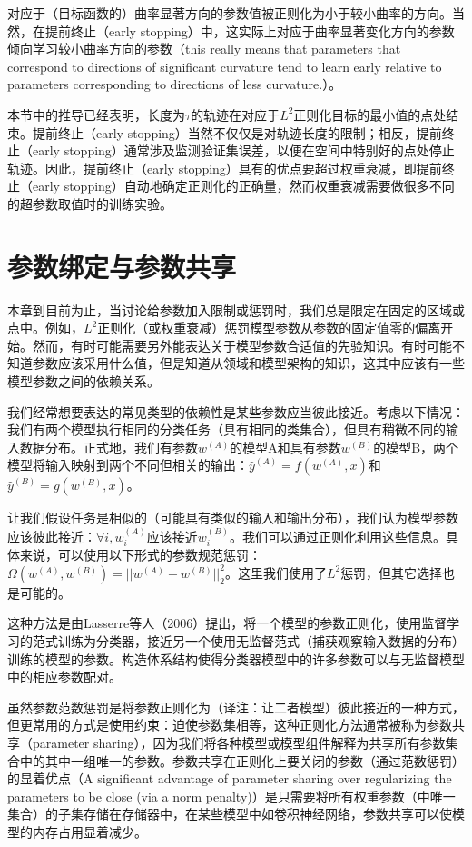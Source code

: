 对应于（目标函数的）曲率显著方向的参数值被正则化为小于较小曲率的方向。当然，在提前终止（early stopping）中，这实际上对应于曲率显著变化方向的参数倾向学习较小曲率方向的参数（this really means that parameters that correspond to directions of signiﬁcant curvature tend to learn early relative to parameters corresponding to directions of less curvature.）。

本节中的推导已经表明，长度为$\tau$的轨迹在对应于$L^2$正则化目标的最小值的点处结束。提前终止（early stopping）当然不仅仅是对轨迹长度的限制；相反，提前终止（early stopping）通常涉及监测验证集误差，以便在空间中特别好的点处停止轨迹。因此，提前终止（early stopping）具有的优点要超过权重衰减，即提前终止（early stopping）自动地确定正则化的正确量，然而权重衰减需要做很多不同的超参数取值时的训练实验。

\section{参数绑定与参数共享}

本章到目前为止，当讨论给参数加入限制或惩罚时，我们总是限定在固定的区域或点中。例如，$L^2$正则化（或权重衰减）惩罚模型参数从参数的固定值零的偏离开始。然而，有时可能需要另外能表达关于模型参数合适值的先验知识。有时可能不知道参数应该采用什么值，但是知道从领域和模型架构的知识，这其中应该有一些模型参数之间的依赖关系。

我们经常想要表达的常见类型的依赖性是某些参数应当彼此接近。考虑以下情况：我们有两个模型执行相同的分类任务（具有相同的类集合），但具有稍微不同的输入数据分布。正式地，我们有参数$w^{(A)}$的模型A和具有参数$w^{(B)}$的模型B，两个模型将输入映射到两个不同但相关的输出：$\hat{y}^{(A)} = f(w^{(A)}, x)$和$\hat{y}^{(B)} = g(w^{(B)}, x)$。

让我们假设任务是相似的（可能具有类似的输入和输出分布），我们认为模型参数应该彼此接近：$\forall i, w_i^{(A)}$应该接近$w_i^{(B)}$。我们可以通过正则化利用这些信息。具体来说，可以使用以下形式的参数规范惩罚：$\Omega (w^{(A)}, w^{(B)}) = || w^{(A)} - w^{(B)} ||_2^{2}$。这里我们使用了$L^2$惩罚，但其它选择也是可能的。

这种方法是由Lasserre等人（2006）提出，将一个模型的参数正则化，使用监督学习的范式训练为分类器，接近另一个使用无监督范式（捕获观察输入数据的分布）训练的模型的参数。构造体系结构使得分类器模型中的许多参数可以与无监督模型中的相应参数配对。

虽然参数范数惩罚是将参数正则化为（译注：让二者模型）彼此接近的一种方式，但更常用的方式是使用约束：迫使参数集相等，这种正则化方法通常被称为参数共享（parameter sharing），因为我们将各种模型或模型组件解释为共享所有参数集合中的其中一组唯一的参数。参数共享在正则化上要关闭的参数（通过范数惩罚）的显着优点（A signiﬁcant advantage of parameter sharing over regularizing the parameters to be close (via a norm penalty)）是只需要将所有权重参数（中唯一集合）的子集存储在存储器中，在某些模型中如卷积神经网络，参数共享可以使模型的内存占用显着减少。

